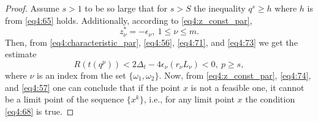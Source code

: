 \begin{proof}
  Assume $s>1$ to be so large that for $s>S$ the inequality $q^s\ge h$ where $h$ is from \eqref{eq4:65} holds. Additionally, according to \eqref{eq4:z_const_par},
  \begin{equation}
    \label{eq4:73}
    z^*_\nu=-\epsilon_\nu,\:1\le\nu\le m.
  \end{equation}
  Then, from \eqref{eq4:characteristic_par}, \eqref{eq4:56}, \eqref{eq4:71}, and \eqref{eq4:73} we get the estimate
  \begin{equation}
    \label{eq4:74}
    R(t(q^p))<2\Delta_t-4\epsilon_\nu(r_\nu L_\nu)<0,\:p\ge s,
  \end{equation}
  where $\nu$ is an index from the set $\{\omega_1,\omega_2\}$.
  Now, from \eqref{eq4:z_const_par}, \eqref{eq4:74}, and \eqref{eq4:57} one can conclude that if the point $x$ is not a feasible one, it cannot be a limit point of the sequence $\{x^k\}$, i.e., for any limit point $x$ the condition \eqref{eq4:68} is true.
\end{proof}

